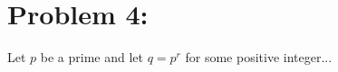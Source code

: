\section{Problem 4:}\label{sec:problem4}

Let $p$ be a prime and let $q = p^r$ for some positive integer...
